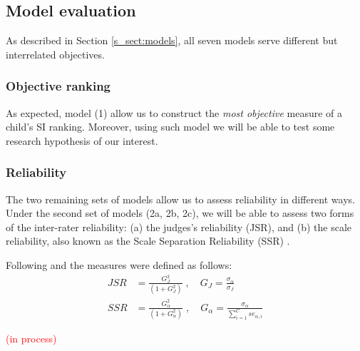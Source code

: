 \subsection{Model evaluation} \label{s_sect:evaluation}
%
As described in Section \ref{s_sect:models}, all seven models serve different but interrelated objectives.
%
%
\subsubsection{Objective ranking}
%
As expected, model (1) allow us to construct the \textit{most objective} measure of a child's SI ranking. Moreover, using such model we will be able to test some research hypothesis of our interest.
%
%
\subsubsection{Reliability}
%
The two remaining sets of models allow us to assess reliability in different ways. Under the second set of models (2a, 2b, 2c), we will be able to assess two forms of the inter-rater reliability: (a) the judges's reliability (JSR), and (b) the scale reliability, also known as the Scale Separation Reliability (SSR) \citep{Bramley_2015}. 

Following \citet{Fisher_1992} and \citet{Wright_1996} the measures were defined as follows:
%
\begin{align}
	JSR &= \frac{ G^{2}_{J} }{ (1 + G^{2}_{J}) }\; , \quad G_{J} = \frac{ \sigma_{\alpha} } { \sigma_{J} } \label{eq:JSR} \\
	SSR &= \frac{ G^{2}_{\alpha} }{ (1 + G^{2}_{\alpha}) }\; , \quad G_{\alpha} = \frac{ \sigma_{\alpha} } { \sum_{i=1}^{C} se_{\alpha, i} } \label{eq:SSR}
\end{align}
%

\textcolor{red}{(in process)}

\begin{comment}
	compare the Scale Separation Reliability (SSR, an inter-rater reliability measure), coming from CJ methods, with others for other methods
	
	- No intra-rater reliability, also known as test-retest reliability (Verhavert_2018, Reliability_wiki_2022) 
	- No Inter-method reliability,  assesses the degree to which test scores are consistent when there is a variation in the methods or instruments used (Verhavert_2018, Reliability_wiki_2022) 
	- No comparison of SSR vs the true correlation of the latent scale and entropy measures 
	* Justification: (Verhavert_2018, p. 156) " simulation studies could resolve the inconclusiveness regarding the SSR as a correlation with the truth."
\end{comment}
%
%
